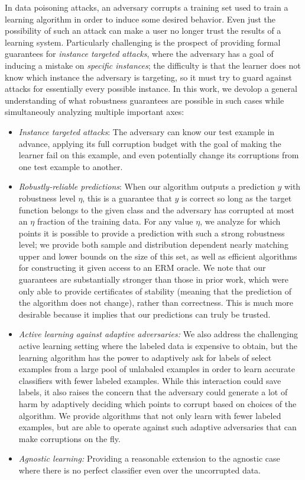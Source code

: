 \documentclass[11pt]{article}
\newcommand{\0}{\mathbf{0}}
\newcommand{\1}{\mathbf{1}}
\begin{document}
In {data poisoning} attacks,  an adversary corrupts a training set used to train a learning algorithm in order to induce some desired behavior. Even just the possibility of such an attack can make a user no longer trust the results of a learning system. Particularly challenging is the prospect of providing formal guarantees for \emph{instance targeted attacks}, where
the adversary has a goal of inducing a mistake on \emph{specific instances}; the difficulty is that the learner does not know which instance the adversary is targeting, so it must try to guard against attacks for essentially every possible instance. In this work, we devolop a general understanding of what robustness guarantees are possible in such cases while simultaneouly analyzing multiple important axes:
\begin{itemize}[leftmargin=*] \itemsep -1pt
\item  {\em Instance targeted attacks}: The adversary can know our test example in advance, applying its full corruption budget with the goal of making the learner fail on this example, and even potentially change its corruptions from one test example to another.
\item {\em Robustly-reliable predictions}: When our algorithm outputs a prediction $y$ with robustness level $\eta$, this is a guarantee that $y$ is correct so long as the target function belongs to the given class and the adversary has corrupted at most an $\eta$ fraction of the training data. For any value $\eta$, we analyze for which points it is possible to provide a prediction with such a strong robustness level; we provide both sample and distribution dependent nearly matching upper and lower bounds on the size of this set, as well as efficient algorithms for constructing it given access to an ERM oracle.
We note that our guarantees are substantially stronger than those in prior work, which were only able to provide certificates of stability (meaning that the prediction of the algorithm does not change), rather than correctness. This is much more desirable because it  implies that our predictions  can truly be trusted.
\item {\em Active learning against adaptive adversaries:} We also address the challenging active learning setting  where the labeled data is expensive to obtain, but the learning algorithm has the power to adaptively ask for labels of select examples from a large pool of unlabaled examples in order to learn accurate classifiers with fewer labeled examples. While this interaction could save labels, it also raises the concern that the adversary could generate a lot of harm by adaptively deciding which points to corrupt based on choices of the algorithm. We provide algorithms that not only learn with fewer labeled examples, but are able to operate against such adaptive adversaries that can make corruptions on the fly.
\item {\em Agnostic learning:} Providing a reasonable extension to the agnostic case where there is no perfect classifier even over the uncorrupted data.
\end{itemize}
\end{document}
